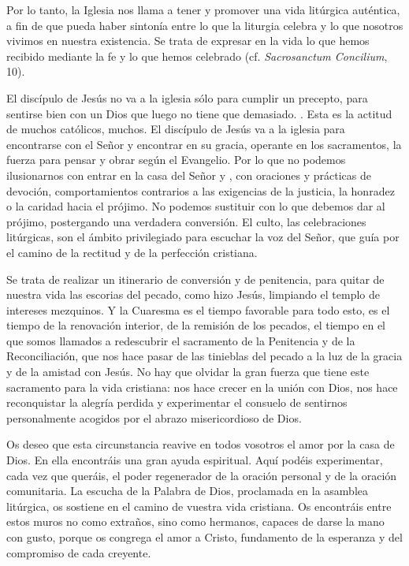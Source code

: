 \begin{body}
Por lo tanto, la Iglesia nos llama a tener y promover una vida litúrgica auténtica, a fin de que pueda haber sintonía entre lo que la liturgia celebra y lo que nosotros vivimos en nuestra existencia. Se trata de expresar en la vida lo que hemos recibido mediante la fe y lo que hemos celebrado (cf. \textit{Sacrosanctum Concilium}, 10).

El discípulo de Jesús no va a la iglesia sólo para cumplir un precepto, para sentirse bien con un Dios que luego no tiene que  demasiado. . Esta es la actitud de muchos católicos, muchos. El discípulo de Jesús va a la iglesia para encontrarse con el Señor y encontrar en su gracia, operante en los sacramentos, la fuerza para pensar y obrar según el Evangelio. Por lo que no podemos ilusionarnos con entrar en la casa del Señor y , con oraciones y prácticas de devoción, comportamientos contrarios a las exigencias de la justicia, la honradez o la caridad hacia el prójimo. No podemos sustituir con  lo que debemos dar al prójimo, postergando una verdadera conversión. El culto, las celebraciones litúrgicas, son el ámbito privilegiado para escuchar la voz del Señor, que guía por el camino de la rectitud y de la perfección cristiana.

Se trata de realizar un itinerario de conversión y de penitencia, para quitar de nuestra vida las escorias del pecado, como hizo Jesús, limpiando el templo de intereses mezquinos. Y la Cuaresma es el tiempo favorable para todo esto, es el tiempo de la renovación interior, de la remisión de los pecados, el tiempo en el que somos llamados a redescubrir el sacramento de la Penitencia y de la Reconciliación, que nos hace pasar de las tinieblas del pecado a la luz de la gracia y de la amistad con Jesús. No hay que olvidar la gran fuerza que tiene este sacramento para la vida cristiana: nos hace crecer en la unión con Dios, nos hace reconquistar la alegría perdida y experimentar el consuelo de sentirnos personalmente acogidos por el abrazo misericordioso de Dios.

 Os deseo que esta circunstancia reavive en todos vosotros el amor por la casa de Dios. En ella encontráis una gran ayuda espiritual. Aquí podéis experimentar, cada vez que queráis, el poder regenerador de la oración personal y de la oración comunitaria. La escucha de la Palabra de Dios, proclamada en la asamblea litúrgica, os sostiene en el camino de vuestra vida cristiana. Os encontráis entre estos muros no como extraños, sino como hermanos, capaces de darse la mano con gusto, porque os congrega el amor a Cristo, fundamento de la esperanza y del compromiso de cada creyente.


\end{body}

